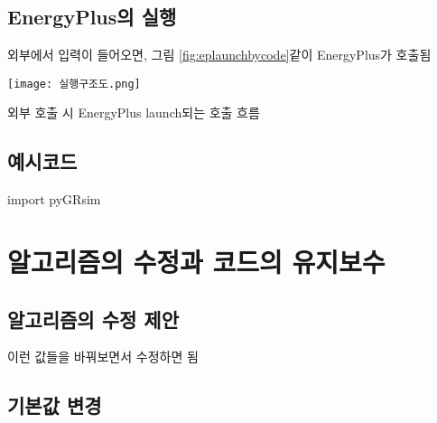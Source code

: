 
\section{EnergyPlus의 실행}
외부에서 입력이 들어오면, 그림 \ref{fig:eplaunchbycode}\와 같이 EnergyPlus가 호출됨
\begin{defaultfigure}
  \texttt{[image: 실행구조도.png]}
  \caption{외부 호출 시 EnergyPlus launch되는 호출 흐름}
  \label{fig:eplaunchbycode}
\end{defaultfigure}


\section{예시코드}

import pyGRsim


\chapter{알고리즘의 수정과 코드의 유지보수}

\section{알고리즘의 수정 제안}

이런 값들을 바꿔보면서 수정하면 됨


\section{기본값 변경}

